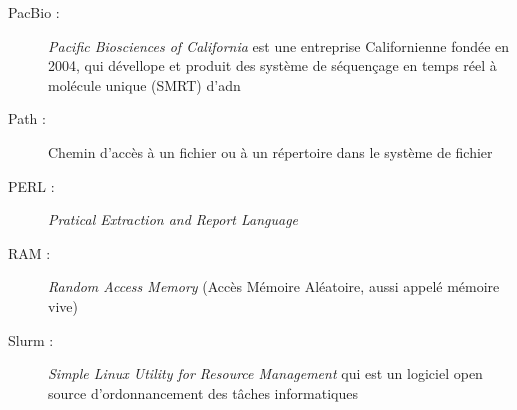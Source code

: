\begin{description}
    \item[PacBio :] \emph{Pacific Biosciences of California} est une entreprise Californienne fondée en 2004, qui dévellope et produit des système de séquençage en temps réel à molécule unique (SMRT) d'adn
    \item[Path : ] Chemin d'accès à un fichier ou à un répertoire dans le système de fichier
    \item[PERL :] \emph{Pratical Extraction and Report Language}
    \item[RAM :] \emph{Random Access Memory} (Accès Mémoire Aléatoire, aussi appelé mémoire vive)
    \item[Slurm :] \emph{Simple Linux Utility for Resource Management} qui est un logiciel open source d'ordonnancement des tâches informatiques
\end{description}